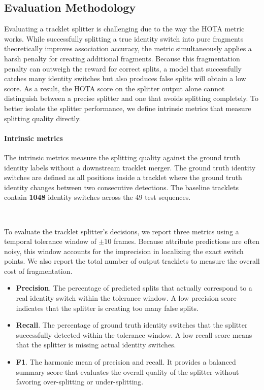 \subsection{Evaluation Methodology}\label{sec:evaluation_methodology}

Evaluating a tracklet splitter is challenging due to the way the HOTA metric works. While successfully splitting a true identity switch into pure fragments theoretically improves association accuracy, the metric simultaneously applies a harsh penalty for creating additional fragments. Because this fragmentation penalty can outweigh the reward for correct splits, a model that successfully catches many identity switches but also produces false splits will obtain a low score. As a result, the HOTA score on the splitter output alone cannot distinguish between a precise splitter and one that avoids splitting completely. To better isolate the splitter performance, we define intrinsic metrics that measure splitting quality directly.

\paragraph{Intrinsic metrics}
The intrinsic metrics measure the splitting quality against the ground truth identity labels without a downstream tracklet merger. The ground truth identity switches are defined as all positions inside a tracklet where the ground truth identity changes between two consecutive detections. The baseline tracklets contain \textbf{1048} identity switches across the 49 test sequences.

\

To evaluate the tracklet splitter's decisions, we report three metrics using a temporal tolerance window of $\pm 10$ frames. Because attribute predictions are often noisy, this window accounts for the imprecision in localizing the exact switch points. We also report the total number of output tracklets to measure the overall cost of fragmentation.

\begin{itemize}
    \item \textbf{Precision}. The percentage of predicted splits that actually correspond to a real identity switch within the tolerance window. A low precision score indicates that the splitter is creating too many false splits.

    \item \textbf{Recall}. The percentage of ground truth identity switches that the splitter successfully detected within the tolerance window. A low recall score means that the splitter is missing actual identity switches.

    \item \textbf{F1}. The harmonic mean of precision and recall. It provides a balanced summary score that evaluates the overall quality of the splitter without favoring over-splitting or under-splitting.
\end{itemize}



